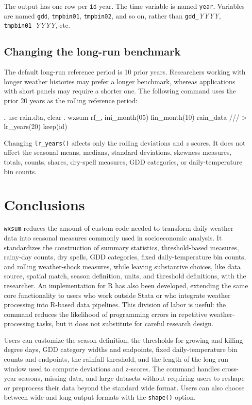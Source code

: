 \noindent The output has one row per \texttt{id}-year. The time variable is named \texttt{year}. Variables are named \texttt{gdd}, \texttt{tmpbin01}, \texttt{tmpbin02}, and so on, rather than \texttt{gdd\_}\textit{YYYY}, \texttt{tmpbin01\_}\textit{YYYY}, etc.

\subsection{Changing the long-run benchmark}

The default long-run reference period is 10 prior years. Researchers working with longer weather histories may prefer a longer benchmark, whereas applications with short panels may require a shorter one. The following command uses the prior 20 years as the rolling reference period:

\begin{stlog}
	. use rain.dta, clear
	. wxsum rf_, ini_month(05) fin_month(10) rain_data ///
	>     lr_years(20) keep(id)
\end{stlog}

\noindent Changing \texttt{lr\_years()} affects only the rolling deviations and $z$ scores. It does not affect the seasonal means, medians, standard deviations, skewness measures, totals, counts, shares, dry-spell measures, GDD categories, or daily-temperature bin counts.

\section{Conclusions}

\texttt{wxsum} reduces the amount of custom code needed to transform daily weather data into seasonal measures commonly used in socioeconomic analysis. It standardizes the construction of summary statistics, threshold-based measures, rainy-day counts, dry spells, GDD categories, fixed daily-temperature bin counts, and rolling weather-shock measures, while leaving substantive choices, like data source, spatial match, season definition, units, and threshold definitions, with the researcher. An implementation for R has also been developed, extending the same core functionality to users who work outside Stata or who integrate weather processing into R-based data pipelines. This division of labor is useful: the command reduces the likelihood of programming errors in repetitive weather-processing tasks, but it does not substitute for careful research design.

Users can customize the season definition, the thresholds for growing and killing degree days, GDD category widths and endpoints, fixed daily-temperature bin counts and endpoints, the rainfall threshold, and the length of the long-run window used to compute deviations and z-scores. The command handles cross-year seasons, missing data, and large datasets without requiring users to reshape or preprocess their data beyond the standard wide format. Users can also choose between wide and long output formats with the \texttt{shape()} option.

